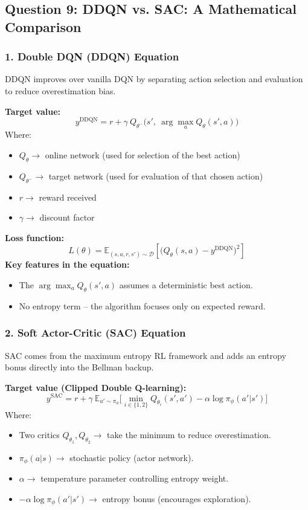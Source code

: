 \documentclass[12pt]{article}
\begin{document}
\subsection{Question 9: DDQN vs. SAC: A Mathematical Comparison}

\subsubsection*{1. Double DQN (DDQN) Equation}
DDQN improves over vanilla DQN by separating action selection and evaluation to reduce overestimation bias.

\textbf{Target value:}
$$ y^{\text{DDQN}} = r + \gamma \ Q_{\theta^-} \big( s', \ \arg\max_a Q_{\theta}(s',a) \big) $$
Where:
\begin{itemize}
    \item $Q_{\theta} \to$ online network (used for selection of the best action)
    \item $Q_{\theta^-} \to$ target network (used for evaluation of that chosen action)
    \item $r \to$ reward received
    \item $\gamma \to$ discount factor
\end{itemize}

\textbf{Loss function:}
$$ L(\theta) = \mathbb{E}_{(s,a,r,s') \sim \mathcal{D}} \left[ \big( Q_{\theta}(s,a) - y^{\text{DDQN}} \big)^2 \right] $$
\textbf{Key features in the equation:}
\begin{itemize}
    \item The $\arg\max_a Q_\theta(s',a)$ assumes a deterministic best action.
    \item No entropy term -- the algorithm focuses only on expected reward.
\end{itemize}

\subsubsection*{2. Soft Actor-Critic (SAC) Equation}
SAC comes from the maximum entropy RL framework and adds an entropy bonus directly into the Bellman backup.

\textbf{Target value (Clipped Double Q-learning):}
$$ y^{\text{SAC}} = r + \gamma \ \mathbb{E}_{a' \sim \pi_\phi} \Big[ \min_{i \in \{1,2\}} Q_{\theta_i}(s',a') - \alpha \log \pi_\phi(a'|s') \Big] $$
Where:
\begin{itemize}
    \item Two critics $Q_{\theta_1}, Q_{\theta_2} \to$ take the minimum to reduce overestimation.
    \item $\pi_\phi(a|s) \to$ stochastic policy (actor network).
    \item $\alpha \to$ temperature parameter controlling entropy weight.
    \item $-\alpha \log \pi_\phi(a'|s') \to$ entropy bonus (encourages exploration).
\end{itemize}
\end{document}
